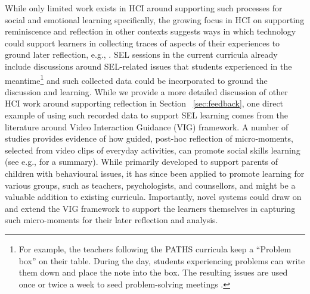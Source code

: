 \documentclass[prodmode,acmtochi]{acmsmall}
\begin{document}
While only limited work exists in HCI around supporting such processes for social and emotional learning specifically, the growing focus in HCI on supporting reminiscence and reflection in other contexts suggests ways in which technology could support learners in collecting traces of aspects of their experiences to ground later reflection, e.g., \cite{Fleck2009,Marcu2012,Sanches2010,McDuff2012}.  
%
SEL sessions in the current curricula already include discussions around SEL-related issues that students experienced in the meantime\footnote{For example, the teachers following the PATHS curricula keep a ``Problem box'' on their table. During the day, students experiencing problems can write them down and place the note into the box. The resulting issues are used once or twice a week to seed problem-solving meetings \cite{Kam2004}.} and such collected data could be incorporated to ground the discussion and learning. 
%
While we provide a more detailed discussion of other HCI work around supporting reflection in Section ~\ref{sec:feedback}, one direct example of using such recorded data to support SEL learning comes from the literature around Video Interaction Guidance (VIG) framework. A number of studies provides evidence of how guided, post-hoc reflection of micro-moments, selected from video clips of everyday activities, can promote social skills learning (see e.g., \cite{Kennedy2011} for a summary). While primarily developed to support parents of children with behavioural issues, it has since been applied to promote learning for various groups, such as teachers, psychologists, and counsellors,  and might be a valuable addition to existing curricula. Importantly, novel systems could draw on and extend the VIG framework to support the learners themselves in capturing such micro-moments for their later reflection and analysis.   

%
%
\end{document}
